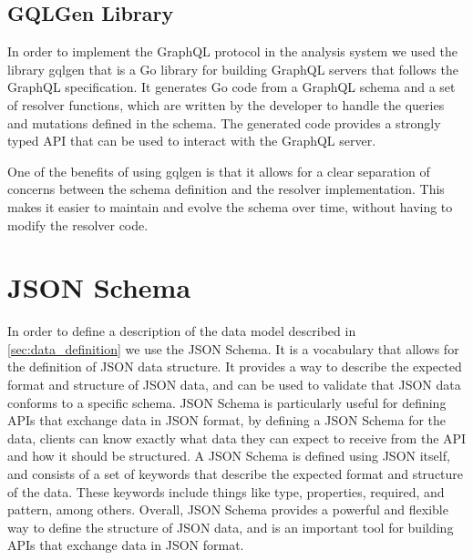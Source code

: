 \subsection{GQLGen Library}

In order to implement the GraphQL protocol \cite{graphql} in the analysis system we used the library
gqlgen \cite{gqlgen} that is a Go library for building GraphQL servers that follows the GraphQL specification. 
It generates Go code from a GraphQL schema and a set of resolver functions, which are written 
by the developer to handle the queries and mutations defined in the schema. The generated code 
provides a strongly typed API that can be used to interact with the GraphQL server.

One of the benefits of using gqlgen is that it allows for a clear separation of 
concerns between the schema definition and the resolver implementation. This makes it 
easier to maintain and evolve the schema over time, without having to modify the resolver code.

\section{JSON Schema}

In order to define a description of the data model described in \ref{sec:data_definition}
we use the JSON Schema. It is a vocabulary that allows for the definition of JSON data structure. 
It provides a way to describe the expected format and structure of JSON data, and 
can be used to validate that JSON data conforms to a specific schema.
JSON Schema is particularly useful for defining APIs that exchange data in JSON 
format, by defining a JSON Schema for the data, clients can know exactly what data 
they can expect to receive from the API and how it should be structured.
A JSON Schema is defined using JSON itself, and consists of a set of keywords 
that describe the expected format and structure of the data. These keywords 
include things like type, properties, required, and pattern, among others.
Overall, JSON Schema provides a powerful and flexible way to define the structure of 
JSON data, and is an important tool for building APIs that exchange data in JSON format.
